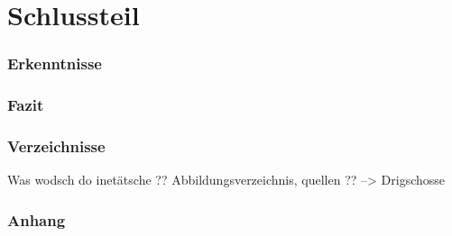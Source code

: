 \part{Schlussteil}



\section{Erkenntnisse}



\section{Fazit} %




\section{Verzeichnisse}

Was wodsch do inetätsche ?? Abbildungsverzeichnis, quellen ?? --> Drigschosse

\section{Anhang}